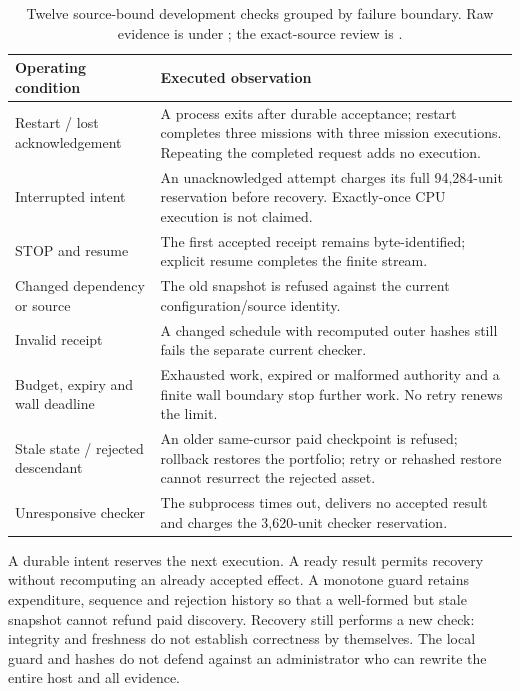 \begin{table}[ht]\centering\small
\begin{tabularx}{\linewidth}{L{39mm}Y}
\toprule
Operating condition & Executed observation \\
\midrule
Restart / lost acknowledgement & A process exits after durable acceptance; restart completes three missions with three mission executions. Repeating the completed request adds no execution. \\
Interrupted intent & An unacknowledged attempt charges its full 94,284-unit reservation before recovery. Exactly-once CPU execution is not claimed. \\
STOP and resume & The first accepted receipt remains byte-identified; explicit resume completes the finite stream. \\
Changed dependency or source & The old snapshot is refused against the current configuration/source identity. \\
Invalid receipt & A changed schedule with recomputed outer hashes still fails the separate current checker. \\
Budget, expiry and wall deadline & Exhausted work, expired or malformed authority and a finite wall boundary stop further work. No retry renews the limit. \\
Stale state / rejected descendant & An older same-cursor paid checkpoint is refused; rollback restores the portfolio; retry or rehashed restore cannot resurrect the rejected asset. \\
Unresponsive checker & The subprocess times out, delivers no accepted result and charges the 3,620-unit checker reservation. \\
\bottomrule
\end{tabularx}
\caption{Twelve source-bound development checks grouped by failure boundary. Raw evidence is under ; the exact-source review is .}
\end{table}

A durable intent reserves the next execution. A ready result permits recovery without recomputing an already accepted effect. A monotone guard retains expenditure, sequence and rejection history so that a well-formed but stale snapshot cannot refund paid discovery. Recovery still performs a new check: integrity and freshness do not establish correctness by themselves. The local guard and hashes do not defend against an administrator who can rewrite the entire host and all evidence.

